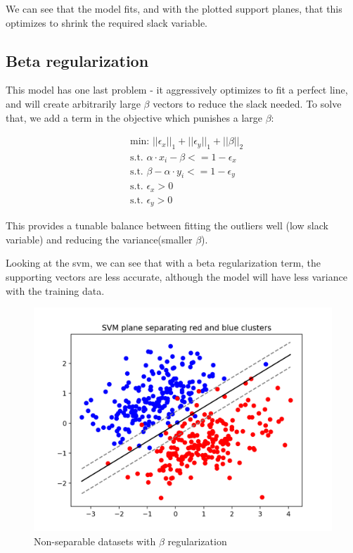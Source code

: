 \documentclass[]{article}
\begin{document}
We can see that the model fits, and with the plotted support planes, that this optimizes to shrink the required slack variable.


\subsection{Beta regularization}

This model has one last problem - it aggressively optimizes to fit a perfect line, and will create arbitrarily large $\beta$ vectors to
reduce the slack needed. To solve that, we add a term in the objective which punishes a large $\beta$:

\begin{equation}
\begin{split}
&\text{min: } ||\epsilon_x||_1 + ||\epsilon_y||_1 + ||\beta||_2
\\
&\text{s.t. } \alpha \cdot x_i - \beta <= 1 - \epsilon_x
\\
&\text{s.t. } \beta - \alpha \cdot y_i  <= 1 - \epsilon_y
\\
&\text{s.t. } \epsilon_x > 0
\\
&\text{s.t. } \epsilon_y > 0
\end{split}
\end{equation}

This provides a tunable balance between fitting the outliers well (low slack variable) and reducing the variance(smaller $\beta$).

Looking at the svm, we can see that with a beta regularization term, the supporting vectors are less accurate, although the model will have less variance with the training data.

\begin{figure}[H]
	\includegraphics[width=\linewidth]{thick_lines.png}
	\caption{Non-separable datasets with $\beta$ regularization}
\end{figure}
\end{document}

